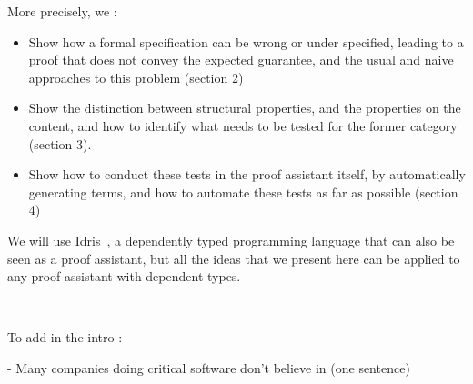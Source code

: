 More precisely, we :
\begin{itemize}
\item Show how a formal specification can be wrong or under specified, leading to a proof that does not convey the expected guarantee, and the usual and naive approaches to this problem (section 2)
\item Show the distinction between structural properties, and the properties on the content, and how to identify what needs to be tested for the former category (section 3).
\item Show how to conduct these tests in the proof assistant itself, by automatically generating terms, and how to automate these tests as far as possible (section 4)
\end{itemize}

We will use Idris~\cite{brady2013idris}, a dependently typed programming language that can also be seen as a proof assistant, but all the ideas that we present here can be applied to any proof assistant with dependent types.


\


To add in the intro :

- Many companies doing critical software don't believe in 
(one sentence)




